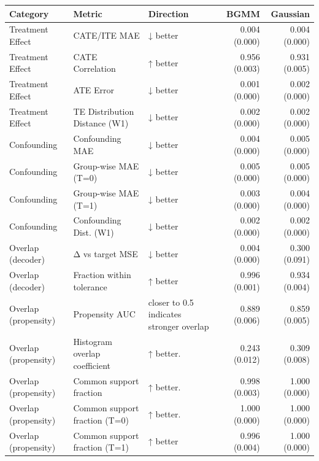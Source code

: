 \begin{tabular}{lllrr}
\toprule
            Category &                        Metric &                                Direction &          BGMM &      Gaussian \\
\midrule
    Treatment Effect &                  CATE/ITE MAE &                                 ↓ better & 0.004 (0.000) & 0.004 (0.000) \\
    Treatment Effect &              CATE Correlation &                                 ↑ better & 0.956 (0.003) & 0.931 (0.005) \\
    Treatment Effect &                     ATE Error &                                 ↓ better & 0.001 (0.000) & 0.002 (0.000) \\
    Treatment Effect & TE Distribution Distance (W1) &                                 ↓ better & 0.002 (0.000) & 0.002 (0.000) \\
         Confounding &               Confounding MAE &                                 ↓ better & 0.004 (0.000) & 0.005 (0.000) \\
         Confounding &          Group-wise MAE (T=0) &                                 ↓ better & 0.005 (0.000) & 0.005 (0.000) \\
         Confounding &          Group-wise MAE (T=1) &                                 ↓ better & 0.003 (0.000) & 0.004 (0.000) \\
         Confounding &        Confounding Dist. (W1) &                                 ↓ better & 0.002 (0.000) & 0.002 (0.000) \\
   Overlap (decoder) &               Δ vs target MSE &                                 ↓ better & 0.004 (0.000) & 0.300 (0.091) \\
   Overlap (decoder) &     Fraction within tolerance &                                 ↑ better & 0.996 (0.001) & 0.934 (0.004) \\
Overlap (propensity) &                Propensity AUC & closer to 0.5 indicates stronger overlap & 0.889 (0.006) & 0.859 (0.005) \\
Overlap (propensity) & Histogram overlap coefficient &                                ↑ better. & 0.243 (0.012) & 0.309 (0.008) \\
Overlap (propensity) &       Common support fraction &                                ↑ better. & 0.998 (0.003) & 1.000 (0.000) \\
Overlap (propensity) & Common support fraction (T=0) &                                ↑ better. & 1.000 (0.000) & 1.000 (0.000) \\
Overlap (propensity) & Common support fraction (T=1) &                                 ↑ better & 0.996 (0.004) & 1.000 (0.000) \\
\bottomrule
\end{tabular}
